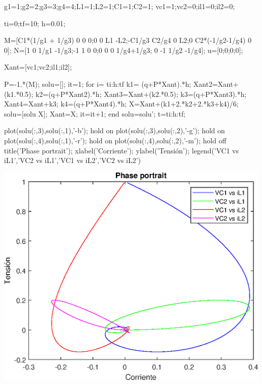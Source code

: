 \documentclass[10pt,a4paper]{article} %
\begin{document}
	
	
	\begin{matlabcode}
	g1=1;g2=2;g3=3;g4=4;L1=1;L2=1;C1=1;C2=1;
	vc1=1;vc2=0;il1=0;il2=0;
	
	ti=0;tf=10;
	h=0.01;
	
	
	M=[C1*(1/g1 + 1/g3) 0 0 0;0 0 L1 -L2;-C1/g3 C2/g4 0 L2;0 C2*(-1/g2-1/g4) 0 0];
	N=[1 0 1/g1 -1/g3;-1 1 0 0;0 0 0 1/g4+1/g3; 0 -1 1/g2 -1/g4];
	u=[0;0;0;0];
	
	Xant=[vc1;vc2;il1;il2];
	
	
	P=-1.*(M\N);
	solu=[];
	it=1;
	for i= ti:h:tf
	k1= (q+P*Xant).*h;
	Xant2=Xant+(k1.*0.5);
	k2=(q+P*Xant2).*h;
	Xant3=Xant+(k2.*0.5);
	k3=(q+P*Xant3).*h;
	Xant4=Xant+k3;
	k4=(q+P*Xant4).*h;
	X=Xant+(k1+2.*k2+2.*k3+k4)/6;
	solu=[solu X];
	Xant=X;
	it=it+1;
	end
	solu=solu';
	t=ti:h:tf;
	\end{matlabcode}
	
	
	\begin{matlabcode}
	plot(solu(:,3),solu(:,1),'-b');
	hold on 
	plot(solu(:,3),solu(:,2),'-g');
	hold on 
	plot(solu(:,4),solu(:,1),'-r');
	hold on 
	plot(solu(:,4),solu(:,2),'-m');
	hold off
	title('Phase portrait');
	xlabel('Corriente');
	ylabel('Tensión'); 
	legend({'VC1 vs iL1','VC2 vs iL1','VC1 vs iL2','VC2 vs iL2'})
	\end{matlabcode}
	\begin{center}
	\includegraphics[width=\maxwidth{56.196688409433015em}]{figure_0_07}
	\end{center}
	
\end{document}

